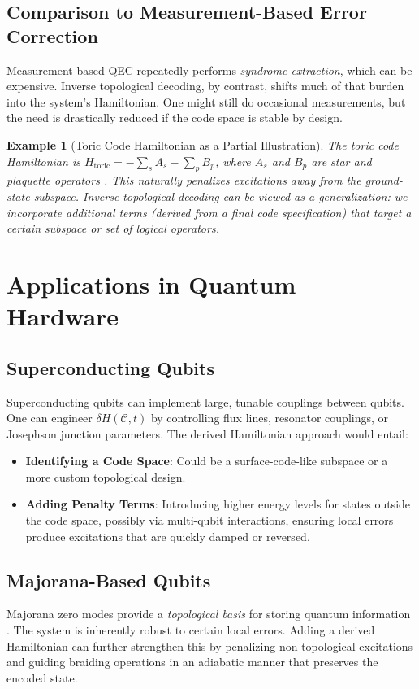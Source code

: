 \documentclass[11pt]{article}
\newtheorem{example}{Example}[section]
\begin{document}
\subsection{Comparison to Measurement-Based Error Correction}
Measurement-based QEC repeatedly performs \emph{syndrome extraction}, which can be expensive. Inverse topological decoding, by contrast, shifts much of that burden into the system’s Hamiltonian. One might still do occasional measurements, but the need is drastically reduced if the code space is stable by design.

\begin{example}[Toric Code Hamiltonian as a Partial Illustration]
The toric code Hamiltonian is $H_{\mathrm{toric}} = -\sum_s A_s - \sum_p B_p$, where $A_s$ and $B_p$ are star and plaquette operators \cite{Kitaev}. This naturally penalizes excitations away from the ground-state subspace. Inverse topological decoding can be viewed as a generalization: we incorporate additional terms (derived from a final code specification) that target a certain subspace or set of logical operators. 
\end{example}

\section{Applications in Quantum Hardware}
\label{sec:hardware}

\subsection{Superconducting Qubits}
Superconducting qubits can implement large, tunable couplings between qubits. One can engineer $\delta H(\mathcal{C}, t)$ by controlling flux lines, resonator couplings, or Josephson junction parameters. The derived Hamiltonian approach would entail:
\begin{itemize}
    \item \textbf{Identifying a Code Space}: Could be a surface-code-like subspace or a more custom topological design.
    \item \textbf{Adding Penalty Terms}: Introducing higher energy levels for states outside the code space, possibly via multi-qubit interactions, ensuring local errors produce excitations that are quickly damped or reversed.
\end{itemize}

\subsection{Majorana-Based Qubits}
Majorana zero modes provide a \emph{topological basis} for storing quantum information \cite{Aguado2017}. The system is inherently robust to certain local errors. Adding a derived Hamiltonian can further strengthen this by penalizing non-topological excitations and guiding braiding operations in an adiabatic manner that preserves the encoded state.
\end{document}
